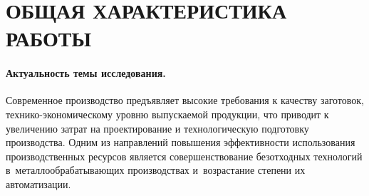 
\section*{ОБЩАЯ ХАРАКТЕРИСТИКА РАБОТЫ}

\paragraph*{Актуальность темы исследования.}

Современное производство предъявляет высокие требования к качеству заготовок, 
технико-экономическому уровню выпускаемой продукции, 
что приводит к увеличению затрат на проектирование и технологическую подготовку производства. 
Одним из направлений повышения эффективности использования
производственных ресурсов является совершенствование безотходных технологий
в~металлообрабатывающих производствах и~возрастание степени их автоматизации.

